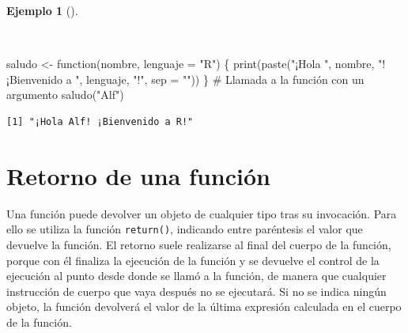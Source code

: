 \documentclass[
  a4paper,
]{scrreport}
\newenvironment{Shaded}{\begin{snugshade}}{\end{snugshade}}
\newcommand{\AttributeTok}[1]{\textcolor[rgb]{0.40,0.45,0.13}{#1}}
\newcommand{\CommentTok}[1]{\textcolor[rgb]{0.37,0.37,0.37}{#1}}
\newcommand{\ControlFlowTok}[1]{\textcolor[rgb]{0.00,0.23,0.31}{#1}}
\newcommand{\FunctionTok}[1]{\textcolor[rgb]{0.28,0.35,0.67}{#1}}
\newcommand{\NormalTok}[1]{\textcolor[rgb]{0.00,0.23,0.31}{#1}}
\newcommand{\OtherTok}[1]{\textcolor[rgb]{0.00,0.23,0.31}{#1}}
\newcommand{\StringTok}[1]{\textcolor[rgb]{0.13,0.47,0.30}{#1}}
\theoremstyle{definition}
\theoremstyle{definition}
\newtheorem{example}{Ejemplo}[chapter]
\theoremstyle{remark}
\begin{document}
\begin{example}[]\protect\hypertarget{exm-argumento-defecto-funcion}{}\label{exm-argumento-defecto-funcion}

~

\begin{Shaded}
\begin{Highlighting}[]
\NormalTok{saludo }\OtherTok{\textless{}{-}} \ControlFlowTok{function}\NormalTok{(nombre, }\AttributeTok{lenguaje =} \StringTok{"R"}\NormalTok{) \{}
  \FunctionTok{print}\NormalTok{(}\FunctionTok{paste}\NormalTok{(}\StringTok{"¡Hola "}\NormalTok{, nombre, }\StringTok{"! ¡Bienvenido a "}\NormalTok{, lenguaje, }\StringTok{"!"}\NormalTok{, }\AttributeTok{sep =} \StringTok{""}\NormalTok{))}
\NormalTok{\}}
\CommentTok{\# Llamada a la función con un argumento}
\FunctionTok{saludo}\NormalTok{(}\StringTok{"Alf"}\NormalTok{)}
\end{Highlighting}
\end{Shaded}

\begin{verbatim}
[1] "¡Hola Alf! ¡Bienvenido a R!"
\end{verbatim}

\end{example}

\hypertarget{retorno-de-una-funciuxf3n}{%
\section{Retorno de una función}\label{retorno-de-una-funciuxf3n}}

Una función puede devolver un objeto de cualquier tipo tras su
invocación. Para ello se utiliza la función \texttt{return()}, indicando
entre paréntesis el valor que devuelve la función. El retorno suele
realizarse al final del cuerpo de la función, porque con él finaliza la
ejecución de la función y se devuelve el control de la ejecución al
punto desde donde se llamó a la función, de manera que cualquier
instrucción de cuerpo que vaya después no se ejecutará. Si no se indica
ningún objeto, la función devolverá el valor de la última expresión
calculada en el cuerpo de la función.
\end{document}
